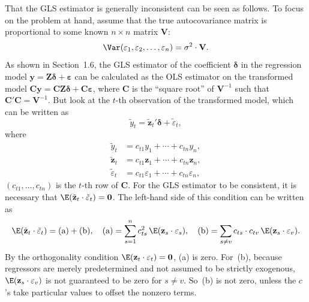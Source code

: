 That the GLS estimator is generally inconsistent can be seen as follows. To
focus on the problem at hand, assume that the true autocovariance matrix is proportional
to some known $n \times n$ matrix $\mathbf{V}$:
\[
  \Var(\varepsilon_1, \varepsilon_2, \ldots, \varepsilon_n) = \sigma^2 \cdot \mathbf{V}.
\]
As shown in Section~1.6, the GLS estimator of the coefficient $\bm{\delta}$ in the regression
model $\mathbf{y} = \mathbf{Z}\bm{\delta} + \bm{\varepsilon}$ can be calculated as the OLS estimator on the transformed model
$\mathbf{C}\mathbf{y} = \mathbf{C}\mathbf{Z}\bm{\delta} + \mathbf{C}\bm{\varepsilon}$, where $\mathbf{C}$ is the ``square root'' of $\mathbf{V}^{-1}$ such that $\mathbf{C}'\mathbf{C} = \mathbf{V}^{-1}$. But
look at the $t$-th observation of the transformed model, which can be written as
\begin{equation}
  \tilde{y}_t = \tilde{\mathbf{z}}_t' \bm{\delta} + \tilde{\varepsilon}_t,
  \label{eq:6.7.12}
\end{equation}
where
\begin{align*}
  \tilde{y}_t &= c_{t1} y_1 + \cdots + c_{tn} y_n, \\
  \tilde{\mathbf{z}}_t &= c_{t1} \mathbf{z}_1 + \cdots + c_{tn} \mathbf{z}_n, \\
  \tilde{\varepsilon}_t &= c_{t1} \varepsilon_1 + \cdots + c_{tn} \varepsilon_n,
\end{align*}
$(c_{t1}, \ldots, c_{tn})$ is the $t$-th row of $\mathbf{C}$.
For the GLS estimator to be consistent, it is necessary that $\E(\tilde{\mathbf{z}}_t \cdot \tilde{\varepsilon}_t) = \mathbf{0}$. The
left-hand side of this condition can be written as
\[
  \E(\tilde{\mathbf{z}}_t \cdot \tilde{\varepsilon}_t) = \text{(a)} + \text{(b)},
  \quad \text{(a)} = \sum_{s=1}^{n} c_{ts}^2\,\E(\mathbf{z}_s \cdot \varepsilon_s),
  \quad \text{(b)} = \sum_{s \neq v} c_{ts} \cdot c_{tv}\,\E(\mathbf{z}_s \cdot \varepsilon_v).
\]
By the orthogonality condition $\E(\mathbf{z}_t \cdot \varepsilon_t) = \mathbf{0}$, (a) is zero. For~(b), because
regressors are merely predetermined and not assumed to be strictly exogenous,
$\E(\mathbf{z}_s \cdot \varepsilon_v)$ is not guaranteed to be zero for $s \neq v$. So~(b) is not zero, unless the $c$'s
take particular values to offset the nonzero terms.

